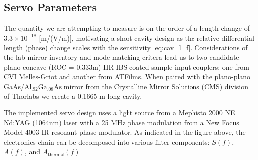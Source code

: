 \subsection{Servo Parameters}
The quantity we are attempting to measure is on the order of a length change of $3.3 \times 10^{-18}$ [m/(V/m)], motivating a short cavity design as the relative differential length (phase) change scales with the sensitivity \ref{eq:cav_l_f}. Considerations of the lab mirror inventory and mode matching critera lead us to two candidate plano-concave (ROC = 0.333m) HR IBS coated sample input couplers; one from CVI Melles-Griot and another from ATFilms. When paired with the plano-plano GaAs/$\mathrm{Al_{.92}Ga_{.08}As}$  mirror from the Crystalline Mirror Solutions (CMS) division of Thorlabs we create a 0.1665 m long cavity.


The implemented servo design uses a light source from a Mephisto 2000 NE Nd:YAG (1064nm) laser with a 25 MHz phase modulation from a New Focus Model 4003 IR resonant phase modulator. As indicated in the figure above, the electronics chain can be decomposed into various filter components: $S(f)$, $A(f)$, and $A_\mathrm{thermal}(f)$

